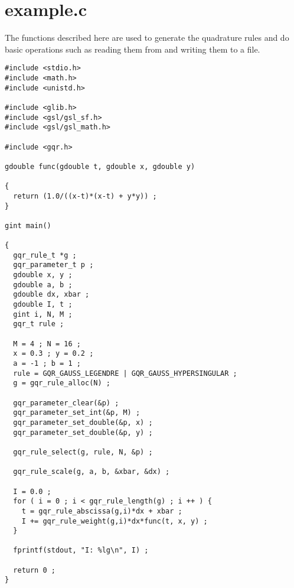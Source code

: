 \section{example.c}
The functions described here are used to generate the quadrature rules and do basic operations such as reading them from and writing them to a file.



\begin{DocInclude}\begin{verbatim}#include <stdio.h>
#include <math.h>
#include <unistd.h>

#include <glib.h>
#include <gsl/gsl_sf.h>
#include <gsl/gsl_math.h>

#include <gqr.h>

gdouble func(gdouble t, gdouble x, gdouble y)

{
  return (1.0/((x-t)*(x-t) + y*y)) ;
}

gint main()

{
  gqr_rule_t *g ;
  gqr_parameter_t p ;
  gdouble x, y ;
  gdouble a, b ;
  gdouble dx, xbar ;
  gdouble I, t ;
  gint i, N, M ;
  gqr_t rule ;

  M = 4 ; N = 16 ; 
  x = 0.3 ; y = 0.2 ;
  a = -1 ; b = 1 ;
  rule = GQR_GAUSS_LEGENDRE | GQR_GAUSS_HYPERSINGULAR ;
  g = gqr_rule_alloc(N) ;

  gqr_parameter_clear(&p) ;
  gqr_parameter_set_int(&p, M) ;
  gqr_parameter_set_double(&p, x) ;
  gqr_parameter_set_double(&p, y) ;

  gqr_rule_select(g, rule, N, &p) ;

  gqr_rule_scale(g, a, b, &xbar, &dx) ;

  I = 0.0 ;
  for ( i = 0 ; i < gqr_rule_length(g) ; i ++ ) {
    t = gqr_rule_abscissa(g,i)*dx + xbar ;
    I += gqr_rule_weight(g,i)*dx*func(t, x, y) ;
  }

  fprintf(stdout, "I: %lg\n", I) ;

  return 0 ;
}
\end{verbatim}
\end{DocInclude}
 